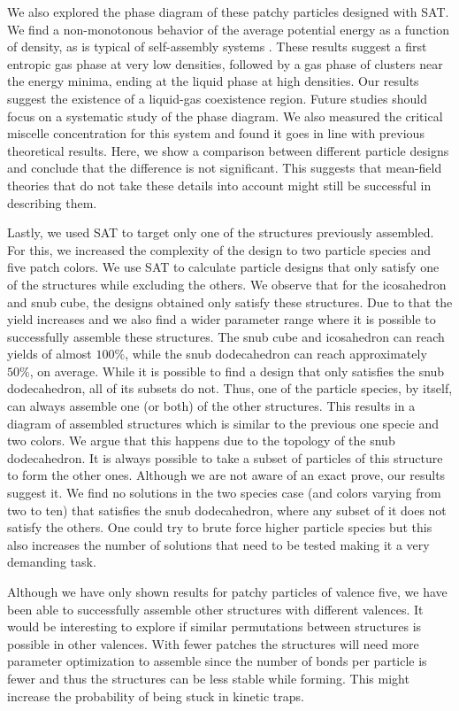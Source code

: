\documentclass[a4paper, amsfonts, amssymb, amsmath, reprint, showkeys, nofootinbib, twoside]{revtex4-1}
\begin{document}
We also explored the phase diagram of these patchy particles designed with SAT. We find a non-monotonous behavior of the average potential energy as a function of density, as is typical of self-assembly systems \cite{Sciortino2009}. These results suggest a first entropic gas phase at very low densities, followed by a gas phase of clusters near the energy minima, ending at the liquid phase at high densities. Our results suggest the existence of a liquid-gas coexistence region. Future studies should focus on a systematic study of the phase diagram. We also measured the critical miscelle concentration for this system and found it goes in line with previous theoretical results. Here, we show a comparison between different particle designs and conclude that the difference is not significant. This suggests that mean-field theories that do not take these details into account might still be successful in describing them.

Lastly, we used SAT to target only one of the structures previously assembled. For this, we increased the complexity of the design to two particle species and five patch colors. We use SAT to calculate particle designs that only satisfy one of the structures while excluding the others. We observe that for the icosahedron and snub cube, the designs obtained only satisfy these structures. Due to that the yield increases and we also find a wider parameter range where it is possible to successfully assemble these structures. The snub cube and icosahedron can reach yields of almost $100\%$, while the snub dodecahedron can reach approximately $50\%$, on average. While it is possible to find a design that only satisfies the snub dodecahedron, all of its subsets do not. Thus, one of the particle species, by itself, can always assemble one (or both) of the other structures. This results in a diagram of assembled structures which is similar to the previous one specie and two colors. We argue that this happens due to the topology of the snub dodecahedron. It is always possible to take a subset of particles of this structure to form the other ones. Although we are not aware of an exact prove, our results suggest it. We find no solutions in the two species case (and colors varying from two to ten) that satisfies the snub dodecahedron, where any subset of it does not satisfy the others. One could try to brute force higher particle species but this also increases the number of solutions that need to be tested making it a very demanding task.

Although we have only shown results for patchy particles of valence five, we have been able to successfully assemble other structures with different valences. It would be interesting to explore if similar permutations between structures is possible in other valences. With fewer patches the structures will need more parameter optimization to assemble since the number of bonds per particle is fewer and thus the structures can be less stable while forming. This might increase the probability of being stuck in kinetic traps.
\end{document}
